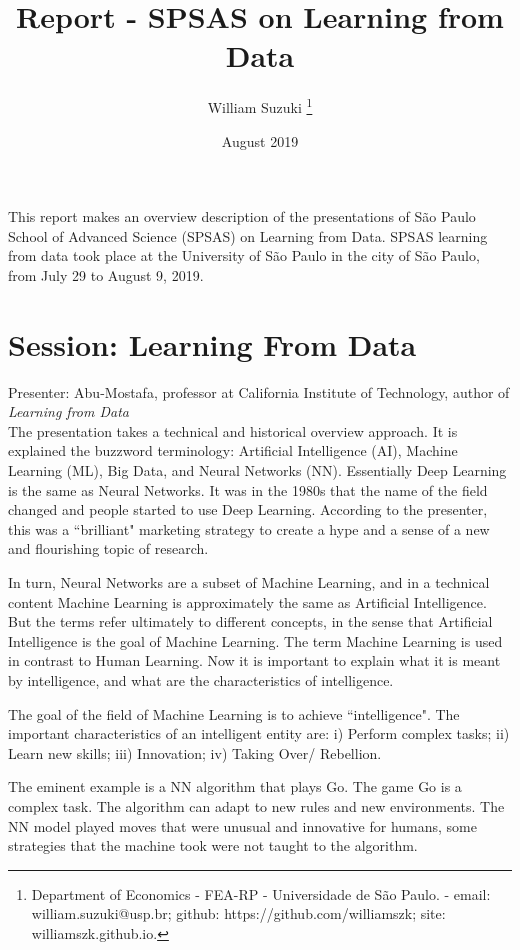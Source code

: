 \documentclass[9pt,a4paper]{article}
\title{Report - SPSAS on Learning from Data}
\date{August 2019}
\author{William Suzuki
\thanks{Department of Economics - FEA-RP - Universidade de São Paulo. - email: william.suzuki@usp.br; github: https://github.com/williamszk; site: williamszk.github.io.}}
\begin{document}

\maketitle

This report makes an overview description of the presentations of São Paulo School of Advanced Science (SPSAS) on Learning from Data. SPSAS learning from data took place at the University of São Paulo in the city of São Paulo, from July 29 to August 9, 2019. 

\section*{Session: Learning From Data }

Presenter: Abu-Mostafa, professor at  California Institute of Technology, author of \textit{Learning from Data}\\

The presentation takes a technical and historical overview approach. 
It is explained the buzzword terminology: Artificial Intelligence (AI), Machine Learning (ML), Big Data, and Neural Networks (NN). 
Essentially Deep Learning is the same as Neural Networks. It was in the 1980s that the name of the field changed and people started to use Deep Learning. According to the presenter, this was a ``brilliant" marketing strategy to create a hype and a sense of a new and flourishing topic of research. 

In turn, Neural Networks are a subset of Machine Learning, and in a technical content Machine Learning is approximately the same as Artificial Intelligence. But the terms refer ultimately to different concepts, in the sense that Artificial Intelligence is the goal of Machine Learning. 
The term Machine Learning is used in contrast to Human Learning. 
Now it is important to explain what it is meant by intelligence, and what are the characteristics of intelligence.

The goal of the field of Machine Learning is to achieve ``intelligence". The important characteristics of an intelligent entity are: i) Perform complex tasks; ii) Learn new skills; iii) Innovation; iv) Taking Over/ Rebellion. 

The eminent example is a NN algorithm that plays Go. The game Go is a complex task.
The algorithm can adapt to new rules and new environments. 
The NN model played moves that were unusual and innovative for humans, some strategies that the machine took were not taught to the algorithm.
\end{document}
